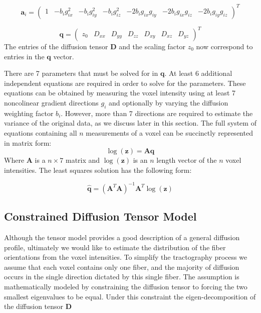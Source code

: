 \begin{equation} \label{eq:xi}
\mathbf{a}_i=
\left( \begin{array}{ccccccc}
1 & -b_ig_{ix}^2 & -b_ig_{iy}^2 & -b_ig_{iz}^2 & -2b_ig_{ix}g_{iy} & -2b_ig_{ix}g_{iz} & -2b_ig_{iy}g_{iz}
\end{array} \right)^T
\end{equation}


\begin{equation} \label{eq:q}
\mathbf{q}=
\left( \begin{array}{ccccccc}
z_0 & D_{xx} & D_{yy} & D_{zz} & D_{xy} & D_{xz} & D_{yz}
\end{array} \right)^T
\end{equation}
%
%
The entries of the diffusion tensor $\mathbf{D}$ and the scaling factor $z_0$ now correspond to entries in the $\mathbf{q}$ vector.

There are 7 parameters that must be solved for in $\mathbf{q}$.  At least 6 additional independent equations are required in order to solve for the parameters.  These equations can be obtained by measuring the voxel intensity using at least 7 noncolinear gradient directions $g_i$ and optionally by varying the diffusion weighting factor $b_i$.  However, more than 7 directions are required to estimate the variance of the original data, as we discuss later in this section. The full system of equations containing all $n$ measurements of a voxel can be succinctly represented in matrix form:
\begin{equation} \label{eq:fulllogtensor}
\log(\mathbf{z})=\mathbf{A}\mathbf{q}
\end{equation}
Where $\mathbf{A}$ is a $n\times7$ matrix and $\log(\mathbf{z})$ is an $n$ length vector of the $n$ voxel intensities.  The least squares solution has the following form:

\begin{equation} \label{eq:LSUpsilon}
\hat{\mathbf{q}} = (\mathbf{A}^T\mathbf{A})^{-1}\mathbf{A}^T\log(\mathbf{z})
\end{equation}

\subsection{Constrained Diffusion Tensor Model}
Although the tensor model provides a good description of a general diffusion profile, ultimately we would like to estimate the distribution of the fiber orientations from the voxel intensities.  To simplify the tractography process we assume that each voxel contains only one fiber, and the majority of diffusion occurs in the single direction dictated by this single fiber.  The assumption is mathematically modeled by constraining the diffusion tensor to forcing the two smallest eigenvalues to be equal.  Under this constraint the eigen-decomposition of the diffusion tensor $\mathbf{D}$

